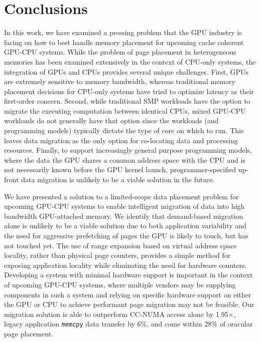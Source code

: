 \vspace{-0.05in}
\section{Conclusions}
\vspace{-0.05in}
\label{conclusions}

In this work, we have examined a pressing problem that the GPU industry is facing on how to best
handle memory placement for upcoming cache coherent GPU-CPU systems.  While the problem of page
placement in heterogeneous memories has been examined extensively in the context of CPU-only systems,
the integration of GPUs
and CPUs provides several unique challenges.  First, GPUs are extremely sensitive to memory
bandwidth, whereas traditional memory placement decisions for CPU-only systems have tried to optimize
latency as their first-order concern.  Second, while traditional SMP workloads have the option
to migrate the executing computation between identical CPUs, mixed GPU-CPU workloads do not generally have
that option since the workloads (and programming models) typically dictate the type of core on which to run.
This leaves data migration as the only option for co-locating data and processing resources.
Finally, to support increasingly general purpose programming models, where the data the GPU shares a 
common address space with the CPU and is not necessarily known before the GPU kernel launch, 
programmer-specified up-front data migration is unlikely to be a viable solution in the future.

We have presented a solution to a limited-scope data placement problem for upcoming GPU-CPU systems
to enable intelligent migration of data into high bandwidth GPU-attached memory.  
We identify that demand-based migration alone is unlikely
to be a viable solution due to both application variability and the need for aggressive prefetching of 
pages the GPU is likely to touch, but has not touched yet.  The use of range expansion based on virtual 
address space locality, rather than physical page counters, provides a simple method for exposing 
application locality while eliminating the need for hardware counters.  Developing a system with 
minimal hardware support is important in the context of upcoming GPU-CPU systems, where multiple 
vendors may be supplying components in such a system and relying on specific hardware support on either 
the GPU or CPU to achieve performant page migration may not be feasible.  Our migration solution
is able to outperform CC-NUMA access alone by 1.95$\times$, legacy
application {\tt memcpy} data transfer by 6\%, and come within 28\% of oracular page placement.

